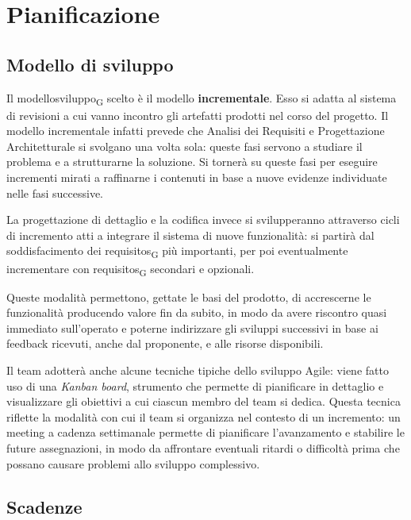 \section{Pianificazione}

\subsection{Modello di sviluppo}

Il \gls{modellosviluppo}\textsubscript{G} scelto è il modello \textbf{incrementale}. Esso si adatta al sistema di revisioni a cui vanno incontro gli artefatti prodotti nel corso del progetto. Il modello incrementale infatti prevede che Analisi dei Requisiti e Progettazione Architetturale si svolgano una volta sola: queste fasi servono a studiare il problema e a strutturarne la soluzione. Si tornerà su queste fasi per eseguire incrementi mirati a raffinarne i contenuti in base a nuove evidenze individuate nelle fasi successive.

La progettazione di dettaglio e la codifica invece si svilupperanno attraverso cicli di incremento atti a integrare il sistema di nuove funzionalità: si partirà dal soddisfacimento dei \glspl{requisito}\textsubscript{G} più importanti, per poi eventualmente incrementare con \glspl{requisito}\textsubscript{G} secondari e opzionali. 

Queste modalità permettono, gettate le basi del prodotto, di accrescerne le funzionalità producendo valore fin da subito, in modo da avere riscontro quasi immediato sull'operato e poterne indirizzare gli sviluppi successivi in base ai feedback ricevuti, anche dal proponente, e alle risorse disponibili.

Il team adotterà anche alcune tecniche tipiche dello sviluppo Agile: viene fatto uso di una \textit{Kanban board}, strumento che permette di pianificare in dettaglio e visualizzare gli obiettivi a cui ciascun membro del team si dedica. Questa tecnica riflette la modalità con cui il team si organizza nel contesto di un incremento: un meeting a cadenza settimanale permette di pianificare l'avanzamento e stabilire le future assegnazioni, in modo da affrontare eventuali ritardi o difficoltà prima che possano causare problemi allo sviluppo complessivo.



\subsection{Scadenze}

